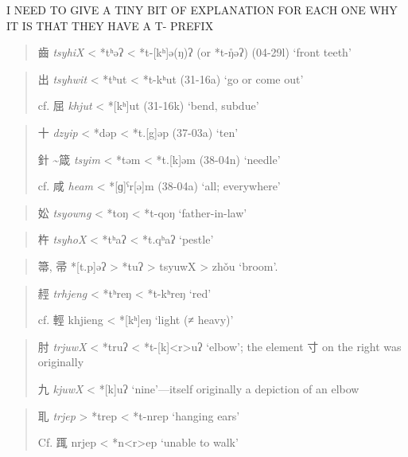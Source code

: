 \documentclass[xetex, svgnames, 12pt]{scrartcl}
\newcounter{para}
\begin{document}
I NEED TO GIVE A TINY BIT OF EXPLANATION FOR EACH ONE WHY IT IS THAT THEY HAVE A T- PREFIX

\begin{quote}
齒 
\textit{tsyhiX} < *tʰəʔ < *t-[kʰ]ə(ŋ)ʔ 
(or *t-ŋ̊əʔ)
(04-29l)
`front teeth'
\end{quote}
\begin{quote}
出 %
\textit{tsyhwit} < *tʰut < *t-kʰut (31-16a)
 `go or come out'
 
cf. 屈 \textit{khjut} < *[kʰ]ut (31-16k)
`bend, subdue'
\end{quote}

\begin{quote}
十 %
\textit{dzyip} < *dəp < *t.[g]əp (37-03a)
`ten'

針 \textasciitilde 箴
\textit{tsyim} < *təm < *t.[k]əm 
(38-04n)
`needle'

cf. 咸 \textit{heam} < *[ɡ]ˁr[ə]m
(38-04a)
`all; everywhere'

\end{quote}
\begin{quote}
妐 %
\textit{tsyowng} < *toŋ < *t-qoŋ 
`father-in-law'
\end{quote}
\begin{quote}
杵 %
\textit{tsyhoX} < *tʰaʔ < *t.qʰaʔ 
`pestle'

\end{quote}
\begin{quote}
箒, 帚 *[t.p]əʔ > *tuʔ > tsyuwX > zhǒu ‘broom’.
\end{quote}
\begin{quote}
䞓 %
\textit{trhjeng} < *tʰreŋ < *t-kʰreŋ
 `red'

cf. 輕 
khjieng < *[kʰ]eŋ 
`light (≠ heavy)'
\end{quote}
\begin{quote}
肘 %
 \textit{trjuwX} < *truʔ < *t-[k]<r>uʔ `elbow'; the element 寸 on the right was originally

九 
\textit{kjuwX} < *[k]uʔ `nine'—itself originally a depiction of an elbow 
\end{quote}
\begin{quote}
耴 %
\textit{trjep} > *trep < *t-nrep 
 `hanging ears' %

Cf. 
踂 %
nrjep < *n<r>ep `unable to walk'
\end{quote}
\end{document}

